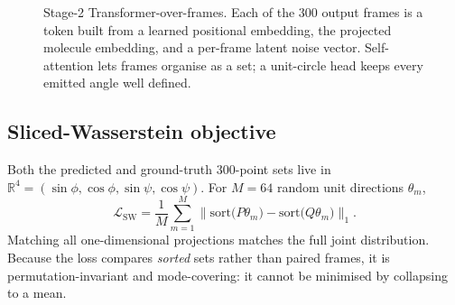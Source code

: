 \documentclass[11pt,a4paper]{article}
\begin{document}
\begin{figure}[H]
\centering
{}
\caption{Stage-2 Transformer-over-frames. Each of the 300 output frames is a
token built from a learned positional embedding, the projected molecule
embedding, and a per-frame latent noise vector. Self-attention lets frames
organise as a set; a unit-circle head keeps every emitted angle well defined.}
\label{fig:stage2}
\end{figure}

\subsection{Sliced-Wasserstein objective}
Both the predicted and ground-truth 300-point sets live in
$\mathbb{R}^4 = (\sin\phi,\cos\phi,\sin\psi,\cos\psi)$. For $M=64$ random unit
directions $\theta_m$,
\[
\mathcal{L}_{\mathrm{SW}}
= \frac{1}{M}\sum_{m=1}^{M}
\Big\| \mathrm{sort}\big(P\theta_m\big) - \mathrm{sort}\big(Q\theta_m\big) \Big\|_1 .
\]
Matching all one-dimensional projections matches the full joint distribution.
Because the loss compares \emph{sorted} sets rather than paired frames, it is
permutation-invariant and mode-covering: it cannot be minimised by collapsing
to a mean.
\end{document}
